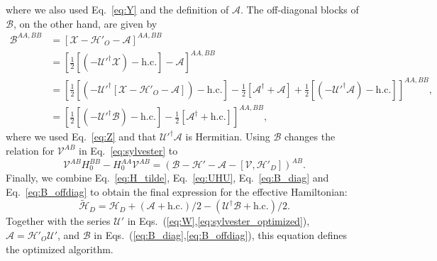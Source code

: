 %
where we also used Eq.~\eqref{eq:Y} and the definition of $\mathcal{A}$.
The off-diagonal blocks of $\mathcal{B}$, on the other hand, are given by
%
\begin{equation}
\label{eq:B_diag}
\begin{aligned}
  \mathcal{B}^{AA, BB} &= \left[\mathcal{X} - \mathcal{H}'_{O} - \mathcal{A}\right]^{AA, BB} \\
  &= \left[\frac{1}{2}[(-\mathcal{U}'^\dagger \mathcal{X})- \textrm{h.c.}] - \mathcal{A}\right]^{AA, BB} \\
  &= \left[\frac{1}{2}[(-\mathcal{U}'^\dagger [\mathcal{X} - \mathcal{H}'_{O} - \mathcal{A}])- \textrm{h.c.}] - \frac{1}{2}[\mathcal{A}^\dagger + \mathcal{A} ] + {\frac{1}{2}[( - \mathcal{U}'^\dagger\mathcal{A} ) - \textrm{h.c.}]}\right]^{AA, BB}, \\
  &= \left[\frac{1}{2}[(-\mathcal{U}'^\dagger \mathcal{B})- \textrm{h.c.}] - \frac{1}{2}[\mathcal{A}^\dagger + \textrm{h.c.} ]\right]^{AA, BB},
\end{aligned}
\end{equation}
%
where we used Eq.~\eqref{eq:Z} and that $\mathcal{U}'^\dagger \mathcal{A}$ is Hermitian.
%
Using $\mathcal{B}$ changes the relation for $\mathcal{V}^{AB}$ in Eq.~\eqref{eq:sylvester} to
\begin{equation}
\label{eq:sylvester_optimized}
\mathcal{V}^{AB}H_0^{BB} - H_0^{AA}\mathcal{V}^{AB} = \left(\mathcal{B} - \mathcal{H}' - \mathcal{A} - [\mathcal{V}, \mathcal{H}'_{D}]\right)^{AB}.
\end{equation}
Finally, we combine Eq.~\eqref{eq:H_tilde}, Eq.~\eqref{eq:UHU}, Eq.~\eqref{eq:B_diag} and Eq.~\eqref{eq:B_offdiag} to obtain the final expression for the effective Hamiltonian:
%
\begin{equation}
\label{eq:H_tilde_optimized}
\tilde{\mathcal{H}}_D = \mathcal{H}_D + (\mathcal{A} + \textrm{h.c.})/2 -(\mathcal{U}^\dagger \mathcal{B} + \textrm{h.c.})/2.
\end{equation}
Together with the series $\mathcal{U}'$ in Eqs.~(\ref{eq:W},\ref{eq:sylvester_optimized}), $\mathcal{A} = \mathcal{H}'_{O}\mathcal{U}'$, and $\mathcal{B}$ in Eqs.~(\ref{eq:B_diag},\ref{eq:B_offdiag}), this equation defines the optimized algorithm.
